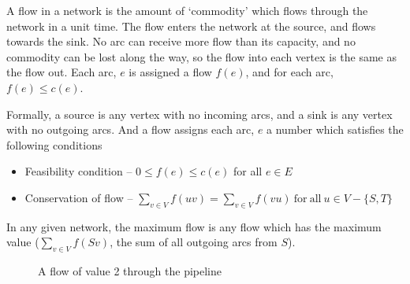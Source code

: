A flow in a network is the amount of `commodity' which flows through the network in a unit time. The flow enters the
 network at the source, and flows towards the sink. No arc can receive more flow than its capacity, and no commodity can
 be lost along the way, so the flow into each vertex is the same as the flow out. Each arc, $e$ is assigned a flow $f(e)$,
 and for each arc, $f(e) \leq c(e)$.

Formally, a source is any vertex with no incoming arcs, and a sink is any vertex with no outgoing arcs. And a flow
 assigns each arc, $e$ a number which satisfies the following conditions
\begin{itemize}
  \item Feasibility condition -- $0 \leq f(e) \leq c(e)$ for all $e \in E$
  \item Conservation of flow -- $\sum_{v \in V}^{} f(uv) = \sum_{v \in V}^{} f(vu) \mathrm{\ for\ all\ } u \in V - \{S, T\}$
\end{itemize}

In any given network, the maximum flow is any flow which has the maximum value ($\sum_{v \in V} f(Sv)$, the sum of all
 outgoing arcs from $S$).

\begin{figure}[H]
  \centering
  \usetikzlibrary{graphs}
  \caption{A flow of value 2 through the pipeline}
  \label{fig:flow1}
\end{figure}

